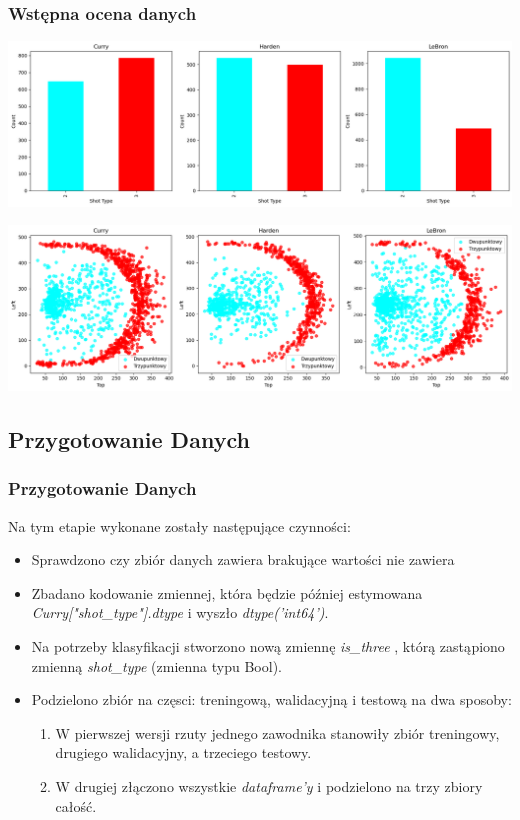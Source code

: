\documentclass{beamer}
\begin{document}
\begin{frame}
	\frametitle{Wstępna ocena danych}
		\includegraphics[width=\linewidth]{WstepnaOcena1.png}


		\includegraphics[width=\linewidth]{WstepnaOcena2.png}

\end{frame}
\subsection{Przygotowanie Danych}
	\begin{frame}
		\frametitle{Przygotowanie Danych}
		Na tym etapie wykonane zostały następujące czynności:
		\begin{itemize}
			\item Sprawdzono czy zbiór danych zawiera brakujące wartości \pauza nie zawiera
			\item Zbadano kodowanie zmiennej, która będzie później estymowana \textit{Curry["shot\_type"].dtype} i wyszło \textit{dtype('int64')}.
			\item Na potrzeby klasyfikacji stworzono nową zmiennę \textit{is\_three}
, którą zastąpiono zmienną \textit{shot\_type} (zmienna typu Bool).
\item Podzielono zbiór na częsci: treningową, walidacyjną i testową na dwa sposoby:
\begin{enumerate}
	\item W pierwszej wersji rzuty jednego zawodnika stanowiły zbiór treningowy, drugiego walidacyjny, a trzeciego testowy.
	\item W drugiej złączono wszystkie \textit{dataframe'y} i podzielono na trzy zbiory całość.
\end{enumerate}
		\end{itemize}
		
	\end{frame}
\end{document}
